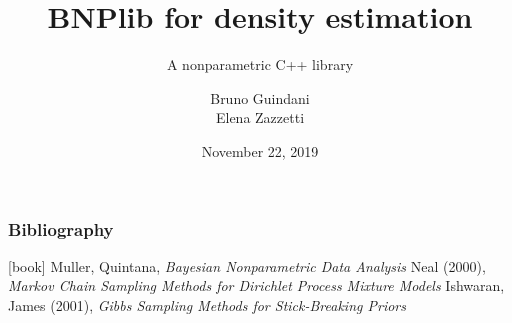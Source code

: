 \documentclass{beamer}
\title[BNPlib]{BNPlib for density estimation}
\subtitle{A nonparametric C++ library}
\author[Guindani, Zazzetti]{Bruno Guindani \\ Elena Zazzetti}
\institute[PoliMi]{\texttt{[image: ../etc/logo\_long.jpg]}}
\date[2019/11/22]{November 22, 2019}
\begin{document}





\begin{frame} %
	\frametitle{Bibliography}
	\begin{thebibliography}{9}
		 Muller, Quintana, \textit{Bayesian Nonparametric Data Analysis}
		 Neal (2000), \textit{Markov Chain Sampling Methods for Dirichlet Process Mixture Models}
		 Ishwaran, James (2001), \textit{Gibbs Sampling Methods for Stick-Breaking Priors}	
	\end{thebibliography}
\end{frame}
\end{document}
